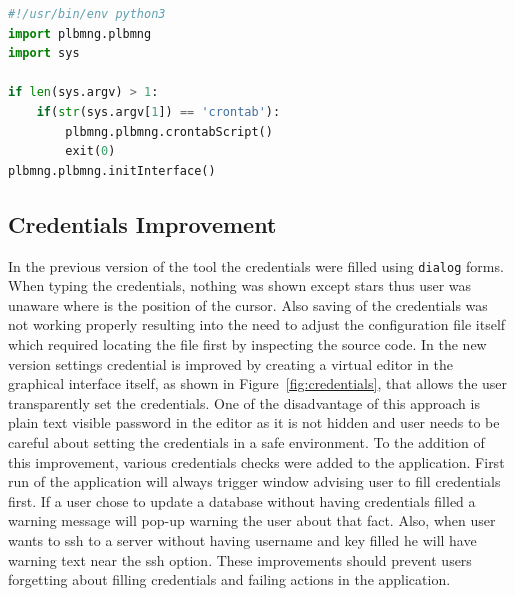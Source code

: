 {{{{{\noindent\begin{minipage}{\linewidth}
\begin{lstlisting}[language=Python, numbers=none, label={lst:plbmngbin}, caption=Source Code of Plbmng Executable Script, frame=single, showstringspaces=false, breaklines=true]
#!/usr/bin/env python3
import plbmng.plbmng
import sys

if len(sys.argv) > 1:
	if(str(sys.argv[1]) == 'crontab'):
		plbmng.plbmng.crontabScript()
		exit(0)
plbmng.plbmng.initInterface()
\end{lstlisting}
\end{minipage}}

\subsection{Credentials Improvement}
In the previous version of the tool the credentials were filled using \texttt{dialog} forms. When typing the credentials, nothing was shown except stars thus user was unaware where is the position of the cursor. Also saving of the credentials was not working properly resulting into the need to adjust the configuration file itself which required locating the file first by inspecting the source code. In the new version settings credential is improved by creating a virtual editor in the graphical interface itself, as shown in Figure~\ref{fig:credentials}, that allows the user transparently set the credentials. One of the disadvantage of this approach is plain text visible password in the editor as it is not hidden and user needs to be careful about setting the credentials in a safe environment. To the addition of this improvement, various credentials checks were added to the application. First run of the application will always trigger window advising user to fill credentials first. If a user chose to update a database without having credentials filled a warning message will pop-up warning the user about that fact. Also, when user wants to ssh to a server without having username and key filled he will have warning text near the ssh option. These improvements should prevent users forgetting about filling credentials and failing actions in the application.

}}}}
